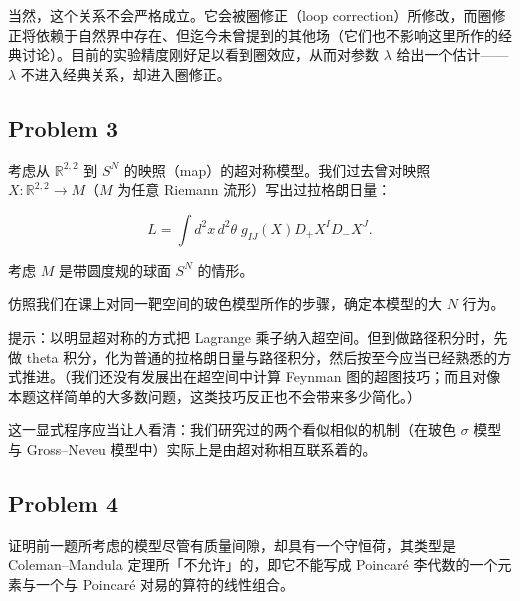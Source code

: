 当然，这个关系不会严格成立。它会被圈修正（loop correction）所修改，而圈修正将依赖于自然界中存在、但迄今未曾提到的其他场（它们也不影响这里所作的经典讨论）。目前的实验精度刚好足以看到圈效应，从而对参数 $\lambda$ 给出一个估计——$\lambda$ 不进入经典关系，却进入圈修正。

\subsection*{Problem 3}

考虑从 $\mathbb{R}^{2,2}$ 到 $S^N$ 的映照（map）的超对称模型。我们过去曾对映照 $X:\mathbb{R}^{2,2}\to M$（$M$ 为任意 Riemann 流形）写出过拉格朗日量：

\begin{equation}
  \tag{4}
  \label{eq:ex-4}
  L=\int d^2x\,d^2\theta\; g_{IJ}(X)D_+X^I D_-X^J .
\end{equation}

考虑 $M$ 是带圆度规的球面 $S^N$ 的情形。

仿照我们在课上对同一靶空间的玻色模型所作的步骤，确定本模型的大 $N$ 行为。



提示：以明显超对称的方式把 Lagrange 乘子纳入超空间。但到做路径积分时，先做 theta 积分，化为普通的拉格朗日量与路径积分，然后按至今应当已经熟悉的方式推进。（我们还没有发展出在超空间中计算 Feynman 图的超图技巧；而且对像本题这样简单的大多数问题，这类技巧反正也不会带来多少简化。）

这一显式程序应当让人看清：我们研究过的两个看似相似的机制（在玻色 $\sigma$ 模型与 Gross–Neveu 模型中）实际上是由超对称相互联系着的。

\subsection*{Problem 4}

证明前一题所考虑的模型尽管有质量间隙，却具有一个守恒荷，其类型是 Coleman–Mandula 定理所「不允许」的，即它不能写成 Poincaré 李代数的一个元素与一个与 Poincaré 对易的算符的线性组合。

